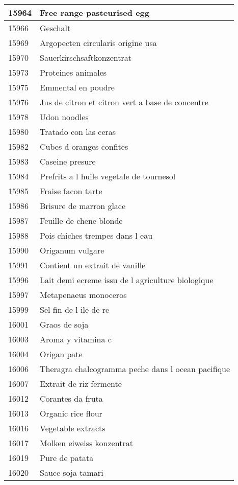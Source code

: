 \begin{longtable}{|l|l|}
15964 & Free range pasteurised egg \\ \hline 
15966 & Geschalt \\ \hline 
15969 & Argopecten circularis origine usa \\ \hline 
15970 & Sauerkirschsaftkonzentrat \\ \hline 
15973 & Proteines animales \\ \hline 
15975 & Emmental en poudre \\ \hline 
15976 & Jus de citron et citron vert a base de concentre \\ \hline 
15978 & Udon noodles \\ \hline 
15980 & Tratado con las ceras \\ \hline 
15982 & Cubes d oranges confites \\ \hline 
15983 & Caseine presure \\ \hline 
15984 & Prefrits a l huile vegetale de tournesol \\ \hline 
15985 & Fraise facon tarte \\ \hline 
15986 & Brisure de marron glace \\ \hline 
15987 & Feuille de chene blonde \\ \hline 
15988 & Pois chiches trempes dans l eau \\ \hline 
15990 & Origanum vulgare \\ \hline 
15991 & Contient un extrait de vanille \\ \hline 
15996 & Lait demi ecreme issu de l agriculture biologique \\ \hline 
15997 & Metapenaeus monoceros \\ \hline 
15999 & Sel fin de l ile de re \\ \hline 
16001 & Graos de soja \\ \hline 
16003 & Aroma y vitamina c \\ \hline 
16004 & Origan pate \\ \hline 
16006 & Theragra chalcogramma peche dans l ocean pacifique \\ \hline 
16007 & Extrait de riz fermente \\ \hline 
16012 & Corantes da fruta \\ \hline 
16013 & Organic rice flour \\ \hline 
16016 & Vegetable extracts \\ \hline 
16017 & Molken eiweiss konzentrat \\ \hline 
16019 & Pure de patata \\ \hline 
16020 & Sauce soja tamari \\ \hline 

\end{longtable}

